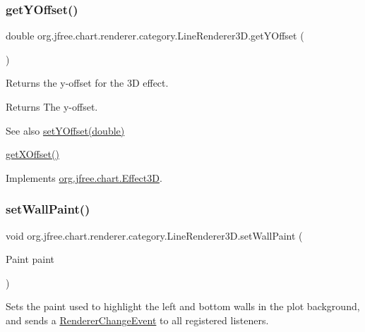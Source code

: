 \subsubsection{\texorpdfstring{get\+Y\+Offset()}{getYOffset()}}
{\footnotesize\ttfamily double org.\+jfree.\+chart.\+renderer.\+category.\+Line\+Renderer3\+D.\+get\+Y\+Offset (\begin{DoxyParamCaption}{ }\end{DoxyParamCaption})}

Returns the y-\/offset for the 3D effect.

\begin{DoxyReturn}{Returns}
The y-\/offset.
\end{DoxyReturn}
\begin{DoxySeeAlso}{See also}
\mbox{\hyperlink{classorg_1_1jfree_1_1chart_1_1renderer_1_1category_1_1_line_renderer3_d_a3f07b5e6292162fcbdf70da3f9d9e2a0}{set\+Y\+Offset(double)}} 

\mbox{\hyperlink{classorg_1_1jfree_1_1chart_1_1renderer_1_1category_1_1_line_renderer3_d_ad4ec91cbd2dd6ec17a01be964f076ad1}{get\+X\+Offset()}} 
\end{DoxySeeAlso}


Implements \mbox{\hyperlink{interfaceorg_1_1jfree_1_1chart_1_1_effect3_d_abcbf35b295e17395237fa4ed03dd9d8e}{org.\+jfree.\+chart.\+Effect3D}}.

\mbox{\label{classorg_1_1jfree_1_1chart_1_1renderer_1_1category_1_1_line_renderer3_d_a536e0183a3e0f39f28bb026b2baad93c}} 
\subsubsection{\texorpdfstring{set\+Wall\+Paint()}{setWallPaint()}}
{\footnotesize\ttfamily void org.\+jfree.\+chart.\+renderer.\+category.\+Line\+Renderer3\+D.\+set\+Wall\+Paint (\begin{DoxyParamCaption}\item[{Paint}]{paint }\end{DoxyParamCaption})}

Sets the paint used to highlight the left and bottom walls in the plot background, and sends a \mbox{\hyperlink{}{Renderer\+Change\+Event}} to all registered listeners.


